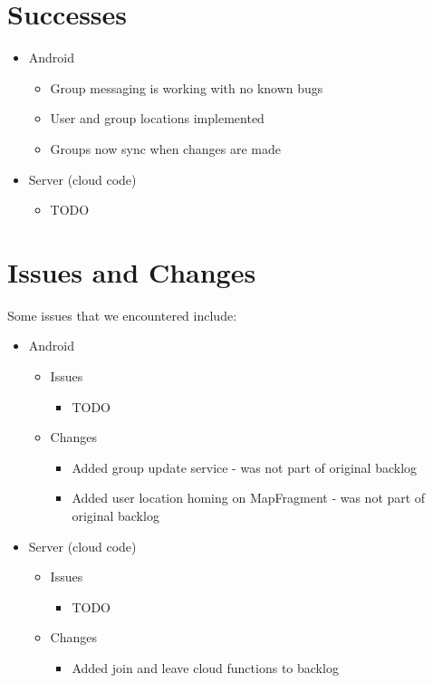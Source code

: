 \documentclass[11pt]{article}
\begin{document}
\section*{Successes}

	\begin{itemize}
		\item Android
		\begin{itemize}
			\item Group messaging is working with no known bugs
			\item User and group locations implemented
			\item Groups now sync when changes are made
		\end{itemize}
		
		\item Server (cloud code)
		\begin{itemize}
			\item TODO
		\end{itemize}
	\end{itemize}


\section*{Issues and Changes}
Some issues that we encountered include:

	\begin{itemize}
		\item Android
			\begin{itemize}
				\item Issues
				\begin{itemize}
					\item TODO				
				\end{itemize}
				
				\item Changes
				\begin{itemize}
					\item Added group update service - was not part of original backlog		
					\item Added user location homing on MapFragment - was not part of original backlog		
				\end{itemize}
			\end{itemize}
			
		\item Server (cloud code)
		\begin{itemize}
				\item Issues
				\begin{itemize}
					\item TODO				
				\end{itemize}
				
				\item Changes
				\begin{itemize}
					\item Added join and leave cloud functions to backlog	
				\end{itemize}
			\end{itemize}
	\end{itemize}
\end{document}
